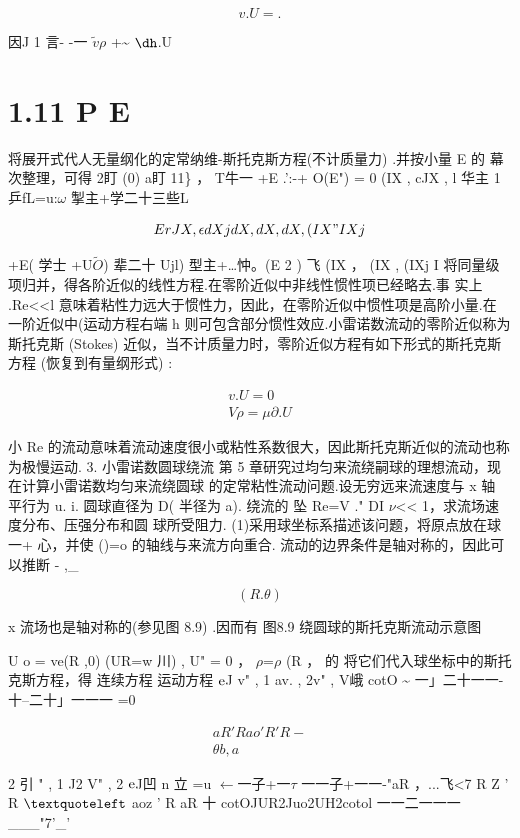 \[v. U = . \]

因J 1 言- -一 $\tilde{v}$$\rho$ +\textasciitilde{} ${\rm ð}$.U

\section*{1.11  P E}

将展开式代人无量纲化的定常纳维-斯托克斯方程(不计质量力) .并按小量 E 的 幕次整理，可得 2盯 (0) a盯 11\} ， T牛一 +E .':-+ O(E") = 0 (IX , cJX , l 华主 1 乒fL=u:$\omega$ 掣主+学二十三些L

\[E rJ X ,  \epsilon  dXjdX,  dX, dX , (IX"IXj\]

+E( 学士 +U$\tilde{O}$) 辈二十 Ujl) 型主+…忡。(E 2 ) 飞 (IX ， (IX , (IXj I 将同量级项归并，得各阶近似的线性方程.在零阶近似中非线性惯性项已经略去.事 实上 .Re<<l 意味着粘性力远大于惯性力，因此，在零阶近似中惯性项是高阶小量.在 一阶近似中(运动方程右端 h 则可包含部分惯性效应.小雷诺数流动的零阶近似称为 斯托克斯 (Stokes) 近似，当不计质量力时，零阶近似方程有如下形式的斯托克斯方程 (恢复到有量纲形式) :

\begin{gather*}
v. U = 0\\
V\rho =\mu  \partial .U
\end{gather*}

小 Re 的流动意味着流动速度很小或粘性系数很大，因此斯托克斯近似的流动也称 为极慢运动. 3. 小雷诺数圆球绕流 第 5 章研究过均匀来流绕嗣球的理想流动，现在计算小雷诺数均匀来流绕圆球 的定常粘性流动问题.设无穷远来流速度与 x 轴 平行为 u. i. 圆球直径为 D( 半径为 a). 绕流的 坠 Re=V ." DI $\nu$<< 1，求流场速度分布、压强分布和圆 球所受阻力. (1)采用球坐标系描述该问题，将原点放在球 一+ 心，并使 ()=o 的轴线与来流方向重合. 流动的边界条件是轴对称的，因此可以推断 - ,\_

\[(R. \theta )\]

x 流场也是轴对称的(参见图 8.9) .因而有 图8.9 绕圆球的斯托克斯流动示意图

U o = ve(R ,0) (UR=w 川) , U" = 0 ， $\rho$=$\rho$ (R ， 的 将它们代入球坐标中的斯托克斯方程，得 连续方程 运动方程 ${\rm e}$J v" , 1 av. , 2v" , V峨 cotO \textasciitilde{} 一」二十一一-十--二十」一一一 =0

\begin{gather*}
aR ' R ao ' R 'R -\\
\theta  b ,  a
\end{gather*}

2 引 " , 1 J2 V" , 2 ${\rm e}$J凹 n 立 =u $\leftarrow$一子+一$\tau$ 一一子+一一-"aR ，...飞<7 R Z ' R ${\rm ‘}$ aoz ' R aR 十 cotOJUR2Juo2UH2cotol 一一二一一一\_\_\_"7'\_'

